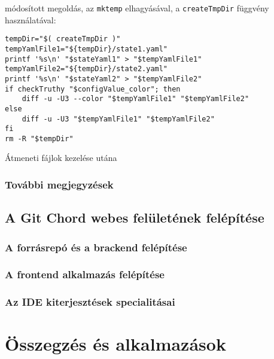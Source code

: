 \documentclass[
]{elteikthesis}[2025/03/25]
\begin{document}
módosított megoldás, az \verb|mktemp| elhagyásával, a \verb|createTmpDir| függvény használatával:

\begin{listing}[H]
\begin{verbatim}
tempDir="$( createTmpDir )"
tempYamlFile1="${tempDir}/state1.yaml"
printf '%s\n' "$stateYaml1" > "$tempYamlFile1"
tempYamlFile2="${tempDir}/state2.yaml"
printf '%s\n' "$stateYaml2" > "$tempYamlFile2"
if checkTruthy "$configValue_color"; then
    diff -u -U3 --color "$tempYamlFile1" "$tempYamlFile2"
else
    diff -u -U3 "$tempYamlFile1" "$tempYamlFile2"
fi
rm -R "$tempDir"
\end{verbatim}
\caption{Átmeneti fájlok kezelése utána}
\end{listing}

\subsection{További megjegyzések}


\section{A Git Chord webes felületének felépítése}

\subsection{A forrásrepó és a brackend felépítése}


\subsection{A frontend alkalmazás felépítése}


\subsection{Az IDE kiterjesztések specialitásai}


\cleardoublepage

\chapter{Összegzés és alkalmazások}
\end{document}

